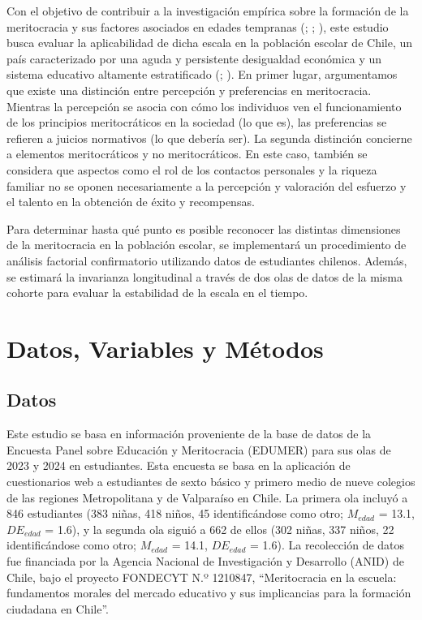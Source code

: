 \documentclass[
  12pt,
]{article}
\begin{document}
Con el objetivo de contribuir a la investigación empírica sobre la
formación de la meritocracia y sus factores asociados en edades
tempranas (;
;
), este
estudio busca evaluar la aplicabilidad de dicha escala en la población
escolar de Chile, un país caracterizado por una aguda y persistente
desigualdad económica y un sistema educativo altamente estratificado
(;
). En primer
lugar, argumentamos que existe una distinción entre percepción y
preferencias en meritocracia. Mientras la percepción se asocia con cómo
los individuos ven el funcionamiento de los principios meritocráticos en
la sociedad (lo que es), las preferencias se refieren a juicios
normativos (lo que debería ser). La segunda distinción concierne a
elementos meritocráticos y no meritocráticos. En este caso, también se
considera que aspectos como el rol de los contactos personales y la
riqueza familiar no se oponen necesariamente a la percepción y
valoración del esfuerzo y el talento en la obtención de éxito y
recompensas.

Para determinar hasta qué punto es posible reconocer las distintas
dimensiones de la meritocracia en la población escolar, se implementará
un procedimiento de análisis factorial confirmatorio utilizando datos de
estudiantes chilenos. Además, se estimará la invarianza longitudinal a
través de dos olas de datos de la misma cohorte para evaluar la
estabilidad de la escala en el tiempo.

\section{Datos, Variables y Métodos}\label{datos-variables-y-muxe9todos}

\subsection{Datos}\label{datos}

Este estudio se basa en información proveniente de la base de datos de
la Encuesta Panel sobre Educación y Meritocracia (EDUMER) para sus olas
de 2023 y 2024 en estudiantes. Esta encuesta se basa en la aplicación de
cuestionarios web a estudiantes de sexto básico y primero medio de nueve
colegios de las regiones Metropolitana y de Valparaíso en Chile. La
primera ola incluyó a 846 estudiantes (383 niñas, 418 niños, 45
identificándose como otro; \(M_{edad}\) = 13.1, \(DE_{edad}\) = 1.6), y
la segunda ola siguió a 662 de ellos (302 niñas, 337 niños, 22
identificándose como otro; \(M_{edad}\) = 14.1, \(DE_{edad}\) = 1.6). La
recolección de datos fue financiada por la Agencia Nacional de
Investigación y Desarrollo (ANID) de Chile, bajo el proyecto FONDECYT
N.º 1210847, ``Meritocracia en la escuela: fundamentos morales del
mercado educativo y sus implicancias para la formación ciudadana en
Chile''.
\end{document}
